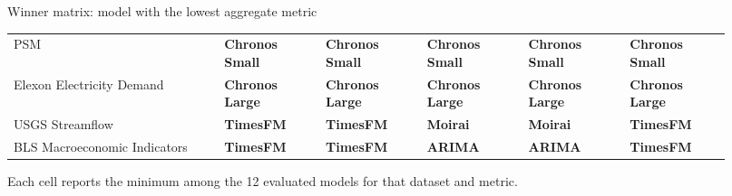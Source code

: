 \begin{frame}{Winner matrix: model with the lowest aggregate metric}
\begin{tabular}{L{0.27\linewidth} C{0.13\linewidth} C{0.13\linewidth} C{0.13\linewidth} C{0.13\linewidth} C{0.13\linewidth}}
    PSM & \textbf{Chronos Small} & \textbf{Chronos Small} & \textbf{Chronos Small} & \textbf{Chronos Small} & \textbf{Chronos Small} \\
    Elexon Electricity Demand & \textbf{Chronos Large} & \textbf{Chronos Large} & \textbf{Chronos Large} & \textbf{Chronos Large} & \textbf{Chronos Large} \\
    USGS Streamflow & \textbf{TimesFM} & \textbf{TimesFM} & \textbf{Moirai} & \textbf{Moirai} & \textbf{TimesFM} \\
    BLS Macroeconomic Indicators & \textbf{TimesFM} & \textbf{TimesFM} & \textbf{ARIMA} & \textbf{ARIMA} & \textbf{TimesFM} \\
    \bottomrule
  \end{tabular}
  \vspace{0.16cm}
  {\scriptsize\color{Muted}Each cell reports the minimum among the 12 evaluated models for that dataset and metric.}
\end{frame}

